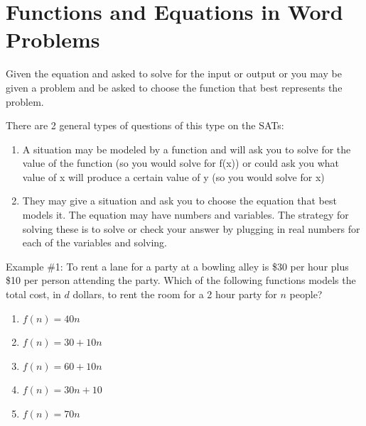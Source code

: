 \begin{multienumerate}
\vfill
{}
\end{multienumerate}

\section[Word Problems]{Functions and Equations in Word Problems}

Given the equation and asked to solve for the input or output or you may be given a problem and be asked to choose the function that best represents the problem.

\bigskip
There are 2 general types of questions of this type on the SATs:

\begin{enumerate}
\item A situation may be modeled by a function and will ask you to solve for the value of the function (so you would solve for f(x)) or could ask you what value of x will produce a certain value of y (so you would solve for x)

\vfill
\item They may give a situation and ask you to choose the equation that best models it. The equation may have numbers and variables. The strategy for solving these is to solve or check your answer by plugging in real numbers for each of the variables and solving.
\end{enumerate}

\vfill
Example \#1: To rent a lane for a party at a bowling alley is \$30 per hour plus \$10 per person attending the party. Which of the following functions models the total cost, in $d$ dollars, to rent the room for a 2 hour party for $n$ people?

\begin{enumerate}[label=(\Alph*)]
\item $f(n)=40n$
\item $f(n)=30+10n$
\item $f(n)=60+10n$
\item $f(n)=30n+10$
\item $f(n)=70n$
\end{enumerate}

